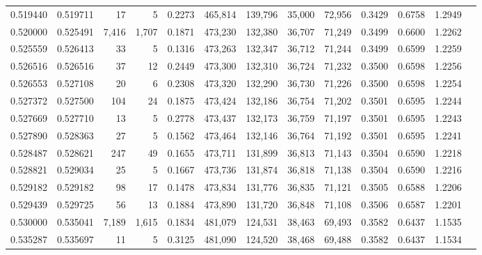 \begin{tabular}{rrrrrrrrrrrrr}
0.519440 & 0.519711 &     17 &     5 &                                     0.2273 & 465,814 & 139,796 &  35,000 &  72,956 & 0.3429 & 0.6758 & 1.2949 \\
0.520000 & 0.525491 &  7,416 & 1,707 &                                     0.1871 & 473,230 & 132,380 &  36,707 &  71,249 & 0.3499 & 0.6600 & 1.2262 \\
0.525559 & 0.526413 &     33 &     5 &                                     0.1316 & 473,263 & 132,347 &  36,712 &  71,244 & 0.3499 & 0.6599 & 1.2259 \\
0.526516 & 0.526516 &     37 &    12 &                                     0.2449 & 473,300 & 132,310 &  36,724 &  71,232 & 0.3500 & 0.6598 & 1.2256 \\
0.526553 & 0.527108 &     20 &     6 &                                     0.2308 & 473,320 & 132,290 &  36,730 &  71,226 & 0.3500 & 0.6598 & 1.2254 \\
0.527372 & 0.527500 &    104 &    24 &                                     0.1875 & 473,424 & 132,186 &  36,754 &  71,202 & 0.3501 & 0.6595 & 1.2244 \\
0.527669 & 0.527710 &     13 &     5 &                                     0.2778 & 473,437 & 132,173 &  36,759 &  71,197 & 0.3501 & 0.6595 & 1.2243 \\
0.527890 & 0.528363 &     27 &     5 &                                     0.1562 & 473,464 & 132,146 &  36,764 &  71,192 & 0.3501 & 0.6595 & 1.2241 \\
0.528487 & 0.528621 &    247 &    49 &                                     0.1655 & 473,711 & 131,899 &  36,813 &  71,143 & 0.3504 & 0.6590 & 1.2218 \\
0.528821 & 0.529034 &     25 &     5 &                                     0.1667 & 473,736 & 131,874 &  36,818 &  71,138 & 0.3504 & 0.6590 & 1.2216 \\
0.529182 & 0.529182 &     98 &    17 &                                     0.1478 & 473,834 & 131,776 &  36,835 &  71,121 & 0.3505 & 0.6588 & 1.2206 \\
0.529439 & 0.529725 &     56 &    13 &                                     0.1884 & 473,890 & 131,720 &  36,848 &  71,108 & 0.3506 & 0.6587 & 1.2201 \\
0.530000 & 0.535041 &  7,189 & 1,615 &                                     0.1834 & 481,079 & 124,531 &  38,463 &  69,493 & 0.3582 & 0.6437 & 1.1535 \\
0.535287 & 0.535697 &     11 &     5 &                                     0.3125 & 481,090 & 124,520 &  38,468 &  69,488 & 0.3582 & 0.6437 & 1.1534 \\

\end{tabular}
